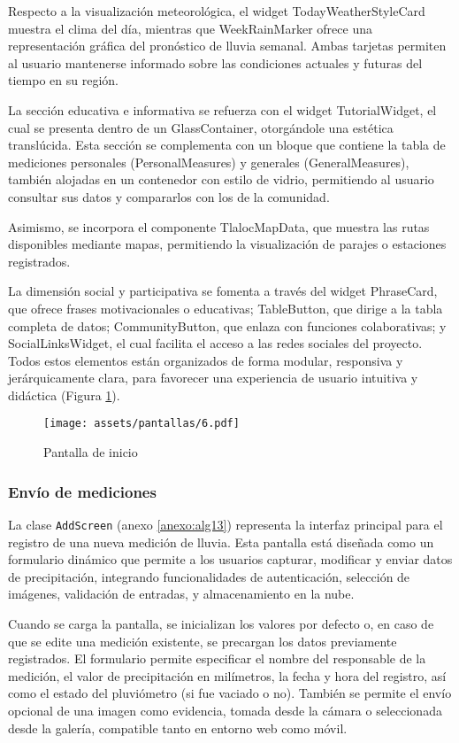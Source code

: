Respecto a la visualización meteorológica, el widget TodayWeatherStyleCard muestra el clima del día, mientras que WeekRainMarker ofrece una representación gráfica del pronóstico de lluvia semanal. Ambas tarjetas permiten al usuario mantenerse informado sobre las condiciones actuales y futuras del tiempo en su región.

La sección educativa e informativa se refuerza con el widget TutorialWidget, el cual se presenta dentro de un GlassContainer, otorgándole una estética translúcida. Esta sección se complementa con un bloque que contiene la tabla de mediciones personales (PersonalMeasures) y generales (GeneralMeasures), también alojadas en un contenedor con estilo de vidrio, permitiendo al usuario consultar sus datos y compararlos con los de la comunidad.

Asimismo, se incorpora el componente TlalocMapData, que muestra las rutas disponibles mediante mapas, permitiendo la visualización de parajes o estaciones registrados. 

La dimensión social y participativa se fomenta a través del widget PhraseCard, que ofrece frases motivacionales o educativas; TableButton, que dirige a la tabla completa de datos;  CommunityButton, que enlaza con funciones colaborativas;  y SocialLinksWidget, el cual facilita el acceso a las redes sociales del proyecto. Todos estos elementos están organizados de forma modular, responsiva y jerárquicamente clara, para favorecer una experiencia de usuario intuitiva y didáctica (Figura \ref{pantallas6}).
\begin{figure}[h!]
\centering
  \texttt{[image: assets/pantallas/6.pdf]}
  \caption{Pantalla de inicio}
  \label{pantallas6}
\end{figure}

  

\newpage
\subsubsection*{Envío de mediciones}


La clase \texttt{AddScreen} (anexo \ref{anexo:alg13}) representa la interfaz principal para el registro de una nueva medición de lluvia. Esta pantalla está diseñada como un formulario dinámico que permite a los usuarios capturar, modificar y enviar datos de precipitación, integrando funcionalidades de autenticación, selección de imágenes, validación de entradas, y almacenamiento en la nube.

Cuando se carga la pantalla, se inicializan los valores por defecto o, en caso de que se edite una medición existente, se precargan los datos previamente registrados. El formulario permite especificar el nombre del responsable de la medición, el valor de precipitación en milímetros, la fecha y hora del registro, así como el estado del pluviómetro (si fue vaciado o no). También se permite el envío opcional de una imagen como evidencia, tomada desde la cámara o seleccionada desde la galería, compatible tanto en entorno web como móvil.

